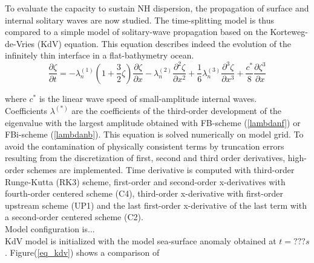 \documentclass[a4paper,11pt]{article}
\begin{document}
To evaluate the capacity to sustain NH dispersion, the propagation of surface and internal solitary waves are now studied. The time-splitting model is thus compared to a simple model of solitary-wave propagation based on the Korteweg-de-Vries (KdV) equation. This equation describes indeed the evolution of the infinitely thin interface in a flat-bathymetry ocean.
\begin{equation}
\frac{\partial \zeta}{\partial t} =
-\lambda_{n}^{(1)}(1+\frac{3}{2}\zeta)\frac{\partial \zeta}{\partial x}
- \lambda_n^{(2)} \frac{\partial ^2 \zeta}{\partial x^2} 
+ \frac{1}{6} \lambda_n^{(3)} \frac{\partial ^3 \zeta}{\partial x^3} 
+ \frac{c^*} {8} \frac{\partial  \zeta^3}{\partial x} 
\label{eq_kdv}
\end{equation}

where $c^*$ is the linear wave speed of small-amplitude internal waves.\\
Coefficients $\lambda^{(*)}$ are the coefficients of the third-order development of the eigenvalue with the largest amplitude obtained with FB-scheme (\ref{lambdanf}) or FBi-scheme (\ref{lambdanb}).
This equation is solved numerically on model grid. To avoid the contamination of physically consistent terms by truncation errors resulting from the discretization of first, second and third order derivatives, high-order schemes are implemented. Time derivative is computed with third-order Runge-Kutta (RK3) scheme, first-order and second-order x-derivatives with fourth-order centered scheme (C4), third-order x-derivative with first-order upstream scheme (UP1) and the last first-order x-derivative of the last term with a second-order centered scheme (C2).\\
Model configuration is...\\
KdV model is initialized with the model sea-surface anomaly obtained at $t=???s$.
Figure(\ref{eq_kdv}) shows a comparison of 


\newpage
\end{document}
